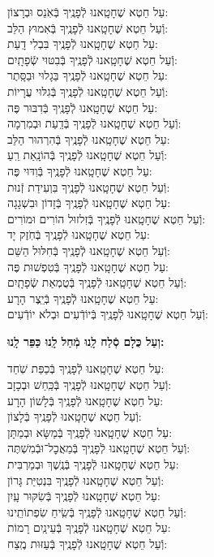 \documentclass[twoside, openany, parskip=half, 11pt]{book}
\begin{document}
עַל חֵטְא שֶׁחָטָֽאנוּ לְֿפָנֶֽיךָ בְּֿאֹֽנֵס וּבְרָצוֹן:\\ וְֿעַל חֵטְא שֶׁחָטָֽאנוּ לְֿפָנֶֽיךָ בְּֿאִמוּץ הַלֵּב: \\
עַל חֵטְא שֶׁחָטָֽאנוּ לְֿפָנֶֽיךָ בִּבְלִי דָֽעַת: \\ וְֿעַל חֵטְא שֶׁחָטָֽאנוּ לְֿפָנֶֽיךָ בְּֿבִטּוּי שְֿׂפָתָֽיִם:\\
עַל חֵטְא שֶׁחָטָֽאנוּ לְֿפָנֶֽיךָ בַּגָלוּי וּבַסָּֽתֶר: \\ וְֿעַל חֵטְא שֶׁחָטָֽאנוּ לְֿפָנֶֽיךָ בְּֿגִלּוּי עֲרָיוֹת: \\
עַל חֵטְא שֶׁחָטָֽאנוּ לְֿפָנֶֽיךָ בְּֿדִבּוּר פֶּה: \\ וְֿעַל חֵטְא שֶׁחָטָֽאנוּ לְֿפָנֶֽיךָ בְּֿדַֽעַת וּבְמִרְמָה: \\
עַל חֵטְא שֶׁחָטָֽאנוּ לְֿפָנֶֽיךָ בְּֿהִרְהוּר הַלֵּב: \\ וְֿעַל חֵטְא שֶׁחָטָֽאנוּ לְֿפָנֶֽיךָ בְּֿהוֹנָֽאַת רֵֽעַ: \\
עַל חֵטְא שֶׁחָטָֽאנוּ לְֿפָנֶֽיךָ בְּֿוִדּוּי פֶּה:\\ וְֿעַל חֵטְא שֶׁחָטָֽאנוּ לְֿפָנֶֽיךָ בִּוְעִידַת זְֿנוּת: \\
עַל חֵטְא שֶׁחָטָֽאנוּ לְֿפָנֶֽיךָ בְּֿזָדוֹן וּבִשְׁגָגָה: \\ וְֿעַל חֵטְא שֶׁחָטָֽאנוּ לְֿפָנֶֽיךָ בְּֿזִלזוּל הוֹרִים וּמוֹרִים:\\
עַל חֵטְא שֶׁחָטָֽאנוּ לְֿפָנֶֽיךָ בְּֿחֹֽזֶק יָד: \\ וְֿעַל חֵטְא שֶׁחָטָֽאנוּ לְֿפָנֶֽיךָ בְּֿחִלּוּל הַשֵּׁם: \\
עַל חֵטְא שֶׁחָטָֽאנוּ לְֿפָנֶֽיךָ בְּֿטִפְשׁוּת פֶּה: \\ וְֿעַל חֵטְא שֶׁחָטָֽאנוּ לְֿפָנֶֽיךָ בְּֿטֻמְאַת שְֿׂפָתָֽיִם: \\
עַל חֵטְא שֶׁחָטָֽאנוּ לְֿפָנֶֽיךָ בְּֿיֵֽצֶר הָרָע: \\ וְֿעַל חֵטְא שֶׁחָטָֽאנוּ לְֿפָנֶֽיךָ בְּֿיוֹדְֿעִים וּבְלֹא יוֹדְֿעִים:

\textbf{וְעַל כֻּלָם סְֿלַח לָֽנוּ מְֿחַל לָֽנוּ כַּפֵּר לָֽנוּ:}

עַל חֵטְא שֶׁחָטָֽאנוּ לְֿפָנֶֽיךָ בְּֿכַפַּת שֹֽׁחַד: \\ וְֿעַל חֵטְא שֶׁחָטָֽאנוּ לְֿפָנֶֽיךָ בְּֿכַּֽחַשׁ וּבְכָזָב: \\
עַל חֵטְא שֶׁחָטָֽאנוּ לְֿפָנֶֽיךָ בְּֿלָשׁוֹן הָרָע:\\ וְֿעַל חֵטְא שֶׁחָטָֽאנוּ לְֿפָנֶֽיךָ בְּֿלָצוֹן:\\
עַל חֵטְא שֶׁחָטָֽאנוּ לְֿפָנֶֽיךָ בְּֿמַשָּׂא וּבְמַתָּן: \\ וְֿעַל חֵטְא שֶׁחָטָֽאנוּ לְֿפָנֶֽיךָ בְּֿמַאֲכׇל־וּבְֿמִשְׁתֶּה:\\
עַל חֵטְא שֶׁחָטָֽאנוּ לְֿפָנֶֽיךָ בְּֿנֶֽשֶׁךְ וּבְמַרְבִּית:\\ וְֿעַל חֵטְא שֶׁחָטָֽאנוּ לְֿפָנֶֽיךָ בִּנְטִיַּת גָּרוֹן: \\
עַל חֵטְא שֶׁחָטָֽאנוּ לְֿפָנֶֽיךָ בְּֿשִׂקּוּר עָֽיִן:\\ וְֿעַל חֵטְא שֶׁחָטָֽאנוּ לְֿפָנֶֽיךָ בְּֿשִֽׂיחַ שִׂפְתוֹתֵֽינוּ: \\
עַל חֵטְא שֶׁחָטָֽאנוּ לְֿפָנֶֽיךָ בְּֿעֵינַֽיִם רָמוֹת:\\ וְֿעַל חֵטְא שֶׁחָטָֽאנוּ לְֿפָנֶֽיךָ בְּֿעַזּוּת מֶֽצַח:
\end{document}
